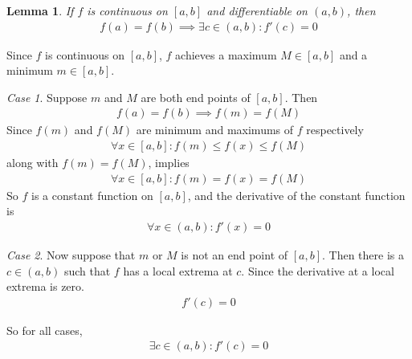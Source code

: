 \documentclass{amsart}
\numberwithin{equation}{section}
\let\oldendproof\endproof
\renewenvironment{proof}[1][\proofname]{%
  \setcounter{case}{0}
  \setcounter{step}{0}
  \oldproof[#1]%
}{\oldendproof}
\theoremstyle{plain}
\newtheorem{lemma}[theorem]{Lemma}
\theoremstyle{definition}
\theoremstyle{remark}
\newtheorem{case}{Case}
\begin{document}
\begin{lemma}%
  If $f$ is continuous on $[a,b]$ and differentiable on $(a,b)$, then
  \begin{align}
    f(a) = f(b) \implies \exists c\in(a,b) : f'(c) = 0
  \end{align}
\end{lemma}
\begin{proof}
  Since $f$ is continuous on $[a,b]$, $f$ achieves a maximum $M\in[a,b]$ and a minimum $m\in[a,b]$.
  \begin{case}
    Suppose $m$ and $M$ are both end points of $[a,b]$. Then 
    \begin{align}
      f(a) = f(b) \implies f(m) = f(M)
    \end{align}
    Since $f(m)$ and $f(M)$ are minimum and maximums of $f$ respectively
    \begin{align}
      \forall x\in[a,b]: f(m)\leq f(x) \leq f(M)
    \end{align}
    along with $f(m)=f(M)$, implies
    \begin{align}
      \forall x\in[a,b]: f(m) = f(x) = f(M)
    \end{align}
    So $f$ is a constant function on $[a,b]$, and the derivative of the constant function is
    \begin{align}
      \forall x\in(a,b): f'(x) = 0
    \end{align}
  \end{case}
  \begin{case}
    Now suppose that $m$ or $M$ is not an end point of $[a,b]$.
    Then there is a $c\in(a,b)$ such that $f$ has a local extrema at $c$. Since the derivative at a local extrema is zero.
    \begin{align}
      f'(c) = 0
    \end{align}
  \end{case}
  So for all cases,
  \begin{align}
    \exists c\in(a,b) : f'(c) = 0
  \end{align}
\end{proof}
\end{document}
